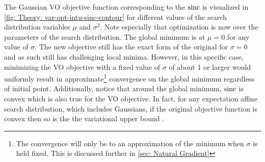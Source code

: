 %
%
The Gaussian \gls{VO} objective function corresponding to the ${\text{sinc}}$ is visualized in \autoref{fig: Theory: var-opt-intu-sinc-contour} for different values of the search distribution variables $\mu$ and $\sigma^2$. Note especially that optimization is now over the parameters of the search distribution. The global minimum is at $\mu=0$ for any value of $\sigma$. The new objective still has the exact form of the original for $\sigma=0$ and as such still has challenging local minima. However, in this specific case, minimizing the \gls{VO} objective with a fixed value of $\sigma$ of about 1 or larger would uniformly result in approximate\footnote{The convergence will only be to an approximation of the minimum when $\sigma$ is held fixed. This is discussed further in \autoref{sec: Natural Gradient}} convergence on the global minimum regardless of initial point.
Additionally, notice that around the global minimum, ${\text{sinc}}$ is convex which is also true for the \gls{VO} objective. In fact, for any expectation affine search distribution, which includes Gaussians, if the original objective function is convex then so is the the variational upper bound \cite{Staines2012}.


